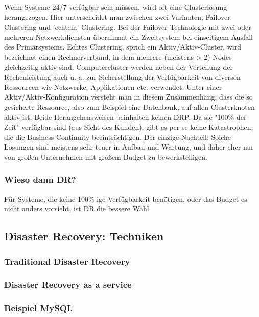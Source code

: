 \documentclass[letterpaper, 12pt]{article}
\let\tempsubsection\subsection
\renewcommand\subsection[1]{\vspace{0cm}\tempsubsection{#1}\vspace{0cm}}
\let\tempsubsubsection\subsubsection
\renewcommand\subsubsection[1]{\vspace{0cm}\tempsubsubsection{#1}\vspace{0cm}}
\begin{document}
Wenn Systeme 24/7 verfügbar sein müssen, wird oft eine Clusterlösung herangezogen. Hier unterscheidet man zwischen zwei Varianten, Failover-Clustering und 'echtem' Clustering. Bei der Failover-Technologie mit zwei oder mehreren Netzwerkdiensten übernimmt ein Zweitsystem bei einseitigem Ausfall des Primärsystems. Echtes Clustering, sprich ein Aktiv/Aktiv-Cluster, wird bezeichnet einen Rechnerverbund, in dem mehrere (meistens > 2) Nodes gleichzeitig aktiv sind. Computercluster werden neben der Verteilung der Rechenleistung auch u. a. zur Sicherstellung der Verfügbarkeit von diversen Ressourcen wie Netzwerke, Applikationen etc. verwendet. Unter einer Aktiv/Aktiv-Konfiguration versteht man in diesem Zusammenhang, dass die so gesicherte Ressource, also zum Beispiel eine Datenbank, auf allen Clusterknoten aktiv ist. Beide Herangehensweisen beinhalten keinen DRP. Da sie "100\% der Zeit" verfügbar sind (aus Sicht des Kunden), gibt es per se keine Katastrophen, die die Business Continuity beeinträchtigen. Der einzige Nachteil: Solche Lösungen sind meistens sehr teuer in Aufbau und Wartung, und daher eher nur von großen Unternehmen mit großem Budget zu bewerkstelligen.

\subsubsection{Wieso dann DR?}

Für Systeme, die keine 100\%-ige Verfügbarkeit benötigen, oder das Budget es nicht anders vorsieht, ist DR die bessere Wahl.

\subsection{Disaster Recovery: Techniken}

\subsubsection{Traditional Disaster Recovery}

\subsubsection{Disaster Recovery as a service}

\subsubsection{Beispiel MySQL}

\clearpage



\listoffigures
\end{document}
